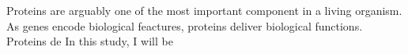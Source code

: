 Proteins are arguably one of the most important component in a living organism. As genes encode biological feactures, proteins deliver biological functions. Proteins de In this study, I will be 